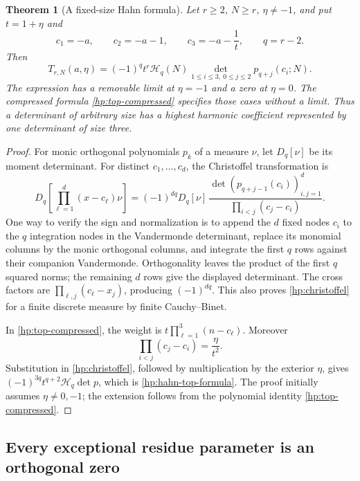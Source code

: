 \documentclass[11pt,a4paper]{article}
\newtheorem{theorem}{Theorem}[section]
\theoremstyle{definition}
\theoremstyle{remark}
\numberwithin{equation}{section}
\begin{document}
\begin{theorem}[A fixed-size Hahn formula]\label{hp:hahn-top}
Let $r\ge2$, $N\ge r$, $\eta\ne-1$, and put $t=1+\eta$ and
\[
 c_1=-a,\qquad c_2=-a-1,\qquad c_3=-a-\frac1t,\qquad q=r-2.
\]
Then
\begin{equation}\label{hp:hahn-top-formula}
 \boxed{\displaystyle
 T_{r,N}(a,\eta)
   =(-1)^q t^r\mathcal H_q(N)
           \det_{1\le i\le3,\ 0\le j\le2}
                         p_{q+j}(c_i;N).}
\end{equation}
The expression has a removable limit at $\eta=-1$ and a zero at
$\eta=0$. The compressed formula \eqref{hp:top-compressed}
specifies those cases without a limit. Thus a determinant of
arbitrary size has a highest harmonic coefficient represented by
one determinant of size three.
\end{theorem}
\begin{proof}
For monic orthogonal polynomials $p_k$ of a measure $\nu$, let
$D_q[\nu]$ be its moment determinant. For distinct $c_1,\ldots,c_d$,
the Christoffel transformation is
\begin{equation}\label{hp:christoffel}
 D_q\!\left[\prod_{\ell=1}^d(x-c_\ell)\nu\right]
 =(-1)^{dq}D_q[\nu]\,
       \frac{\det(p_{q+j-1}(c_i))_{i,j=1}^d}
            {\prod_{i<j}(c_j-c_i)}.
\end{equation}
One way to verify the sign and normalization is to append the
$d$ fixed nodes $c_i$ to the $q$ integration nodes in the
Vandermonde determinant, replace its monomial columns by the
monic orthogonal columns, and integrate the first $q$ rows
against their companion Vandermonde. Orthogonality leaves the
product of the first $q$ squared norms; the remaining $d$ rows
give the displayed determinant. The cross factors are
$\prod_{\ell,j}(c_\ell-x_j)$, producing $(-1)^{dq}$.
This also proves \eqref{hp:christoffel} for a finite discrete
measure by finite Cauchy--Binet.

In \eqref{hp:top-compressed}, the weight is
$t\prod_{\ell=1}^3(n-c_\ell)$. Moreover
\[
 \prod_{i<j}(c_j-c_i)=\frac{\eta}{t^2}.
\]
Substitution in \eqref{hp:christoffel}, followed by multiplication
by the exterior $\eta$, gives
$(-1)^{3q}t^{q+2}\mathcal H_q\det p$, which is
\eqref{hp:hahn-top-formula}. The proof initially assumes
$\eta\ne0,-1$; the extension follows from the polynomial
identity \eqref{hp:top-compressed}.
\end{proof}

\subsection{Every exceptional residue parameter is an orthogonal zero}
\end{document}

